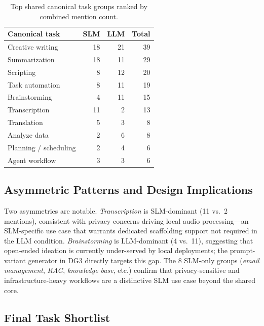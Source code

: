 \begin{table}[t]
  \caption{Top shared canonical task groups ranked by combined mention count.}
  \label{tab:overlap}
  \small
  \begin{tabular}{lrrr}
    \toprule
    Canonical task & SLM & LLM & Total \\
    \midrule
    Creative writing      & 18 & 21 & 39 \\
    Summarization         & 18 & 11 & 29 \\
    Scripting             &  8 & 12 & 20 \\
    Task automation       &  8 & 11 & 19 \\
    Brainstorming         &  4 & 11 & 15 \\
    Transcription         & 11 &  2 & 13 \\
    Translation           &  5 &  3 &  8 \\
    Analyze data          &  2 &  6 &  8 \\
    Planning / scheduling &  2 &  4 &  6 \\
    Agent workflow        &  3 &  3 &  6 \\
    \bottomrule
  \end{tabular}
\end{table}

\subsection{Asymmetric Patterns and Design Implications}

Two asymmetries are notable.
\textit{Transcription} is SLM-dominant (11 vs.\ 2 mentions), consistent with
privacy concerns driving local audio processing---an SLM-specific use case
that warrants dedicated scaffolding support not required in the LLM condition.
\textit{Brainstorming} is LLM-dominant (4 vs.\ 11), suggesting that
open-ended ideation is currently under-served by local deployments; the
prompt-variant generator in DG3 directly targets this gap.
The 8 SLM-only groups (\textit{email management}, \textit{RAG},
\textit{knowledge base}, etc.) confirm that privacy-sensitive and
infrastructure-heavy workflows are a distinctive SLM use case beyond the
shared core.

\subsection{Final Task Shortlist}

